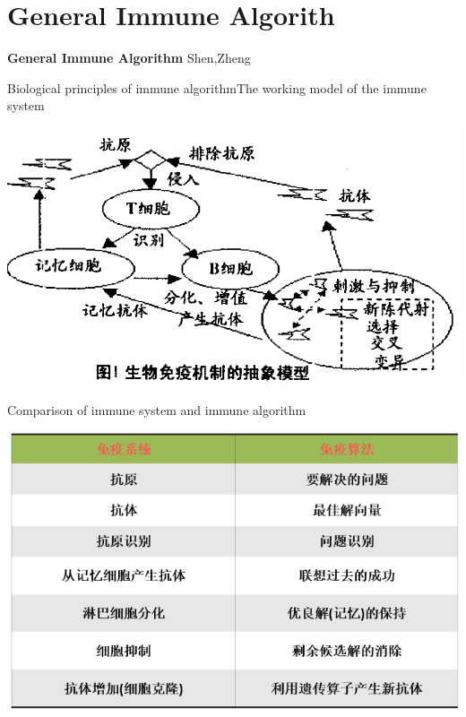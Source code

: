 \section{General Immune Algorith}

\begin{frame}
\Huge \textbf{General Immune Algorithm}
\large {Shen,Zheng}
\end{frame}


\begin{frame}{Biological principles of immune algorithm}{The working model of the immune system}
 
  
  \par
  \centering
  \includegraphics[scale=0.5]{img/1.png}
  \par
  
\end{frame}
\begin{frame}{Comparison of immune system and immune algorithm}
 
  
  \par
  \centering
  \includegraphics[scale=0.6]{img/2.PNG}
  \par
  
\end{frame}



